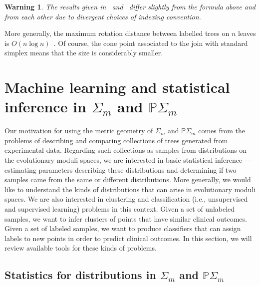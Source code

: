 \documentclass[a4paper,11pt]{article}
\newtheorem{warning}[theorem]{Warning}
\begin{document}
\begin{warning}
The results given in~\cite{pournin2014diameter} and~\cite{sleator1988rotation} differ slightly from the formula above and from each other due to divergent choices of indexing convention.
\end{warning}

More generally, the maximum rotation distance between labelled trees on $n$ leaves is $O(n \log n)$~\cite{sleator1992short}.
Of course, the cone point associated to the join with standard simplex means that the size is considerably smaller.


\section{Machine learning and statistical inference in $\Sigma_m$ and $\mathbb{P}\Sigma_m$}\label{sec:ML}

Our motivation for using the metric geometry of $\Sigma_m$ and $\mathbb{P}\Sigma_m$ comes from the problems of describing and comparing collections of trees generated from experimental data.
Regarding such collections as samples from distributions on the evolutionary moduli spaces, we are interested in basic statistical inference --- estimating parameters describing these distributions and determining if two samples came from the same or different distributions.
More generally, we would like to understand the kinds of distributions that can arise in evolutionary moduli spaces.
We are also interested in clustering and classification (i.e., unsupervised and supervised learning) problems in this context.
Given a set of unlabeled samples, we want to infer clusters of points that have similar clinical outcomes.
Given a set of labeled samples, we want to produce classifiers that can assign labels to new points in order to predict clinical outcomes.
In this section, we will review available tools for these kinds of problems.

\subsection{Statistics for distributions in $\Sigma_m$ and $\mathbb{P}\Sigma_m$}
\end{document}

